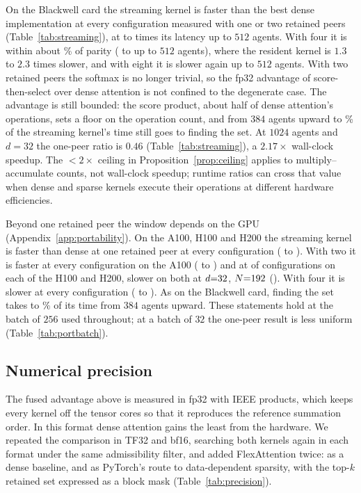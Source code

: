 On the Blackwell card the streaming kernel is faster than the best dense
implementation at every configuration measured with one or two retained peers
(Table~\ref{tab:streaming}), at \StreamKOneLo{} to \StreamKTwoHi{} times its
latency up to $512$ agents. With four it is within about \StreamKFourDev{}\% of
parity (\StreamKFourLo{} to \StreamKFourHi{} up to $512$ agents), where the
resident kernel is $1.3$ to $2.3$ times slower, and with eight it is slower
again up to $512$ agents. With two retained peers the softmax is no longer
trivial, so the fp32 advantage of score-then-select over dense attention is not
confined to the degenerate case. The advantage is still bounded: the score
product, about half of dense attention's operations, sets a floor on the
operation count, and from $384$ agents upward
\StreamFindLo{} to \StreamFindHi{}\% of the streaming kernel's time still goes
to finding the set. At $1024$ agents and $d{=}32$ the one-peer ratio is $0.46$
(Table~\ref{tab:streaming}), a $2.17\times$ wall-clock speedup. The $<2\times$
ceiling in Proposition~\ref{prop:ceiling} applies to multiply--accumulate counts,
not wall-clock speedup; runtime ratios can cross that value when dense and
sparse kernels execute their operations at different hardware efficiencies.

Beyond one retained peer the window depends on the GPU
(Appendix~\ref{app:portability}). On the A100, H100 and H200 the streaming
kernel is faster than dense at one retained peer at every configuration
(\PortStreamOneLo{} to \PortStreamOneHi{}). With two it is faster at every
configuration on the A100 (\PortStreamTwoAHundredLo{} to
\PortStreamTwoAHundredHi{}) and at \PortStreamTwoHopperWins{} of
\PortStreamTwoConfigs{} configurations on each of the H100 and H200, slower on both at
$d{=}32{}$, $N{=}192{}$
(\PortStreamTwoHopperWorst{}). With four it is slower at every configuration
(\PortStreamFourLo{} to \PortStreamFourHi{}). As on the Blackwell card, finding
the set takes \PortStreamFindLo{} to \PortStreamFindHi{}\% of its time from
$384$ agents upward. These statements hold at the batch of $256$ used
throughout; at a batch of $32$ the one-peer result is less uniform
(Table~\ref{tab:portbatch}).

\subsection{Numerical precision}
\label{sec:precision}

The fused advantage above is measured in fp32 with IEEE products, which keeps
every kernel off the tensor cores so that it reproduces the reference summation
order. In this format dense attention gains the least from the hardware. We
repeated the comparison in TF32 and bf16, searching both kernels again in each
format under the same admissibility filter, and added FlexAttention
\citep{dong2025flexattention} twice: as a dense baseline, and as PyTorch's
route to data-dependent sparsity, with the top-$k$ retained set expressed as a
block mask (Table~\ref{tab:precision}).

